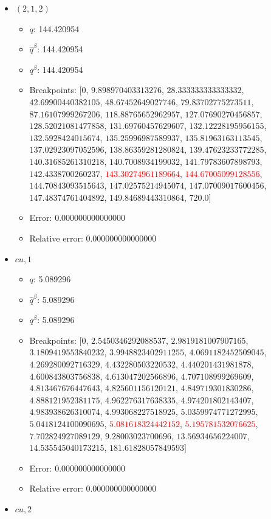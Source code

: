 \documentclass{article}%
\begin{document}
\begin{itemize}
\begin{itemize}
	\end{itemize}%
	\item $(2, 1, 2)$%
	\begin{itemize}%
		\item $q$: 144.420954%
		\item $\hat{q}^\beta$: 144.420954%
		\item $q^\beta$: 144.420954%
		\item Breakpoints: $[$$0$, $9.898970403313276$, $28.333333333333332$, $42.69900440382105$, $48.67452649027746$, $79.83702775273511$, $87.16107999267206$, $118.88765652962957$, $127.07690270456857$, $128.52021081477858$, $131.69760457629607$, $132.12228195956155$, $132.5928424015674$, $135.25996987589937$, $135.81963163113545$, $137.02923097052596$, $138.86359281280824$, $139.47623233772285$, $140.31685261310218$, $140.7008934199032$, $141.79783607898793$, $142.4338700260237$, \textcolor{red}{$143.30274961189664$}, \textcolor{red}{$144.67005099128556$}, $144.70843093515643$, $147.02575214945074$, $147.07009017600456$, $147.48374761404892$, $149.84689443310864$, $720.0$$]$%
		\item Error: 0.000000000000000%
		\item Relative error: 0.000000000000000%
	\end{itemize}%
	\item $\textit{cu},1$%
	\begin{itemize}%
		\item $q$: 5.089296%
		\item $\hat{q}^\beta$: 5.089296%
		\item $q^\beta$: 5.089296%
		\item Breakpoints: $[$$0$, $2.5450346292088537$, $2.9819181007907165$, $3.1809419553840232$, $3.9948823402911255$, $4.0691182452509045$, $4.269280092716329$, $4.432280503220532$, $4.440201431981878$, $4.600843803756838$, $4.613047202566896$, $4.707108999269609$, $4.813467676447643$, $4.825601156120121$, $4.849719301830286$, $4.888121952381175$, $4.962276317638335$, $4.974201802143407$, $4.983938626310074$, $4.993068227518925$, $5.0359974771272995$, $5.0418124100090695$, \textcolor{red}{$5.081618324442152$}, \textcolor{red}{$5.195781532076625$}, $7.702824927089129$, $9.28003023700696$, $13.56934656224007$, $14.535545040173215$, $181.61828057849593$$]$%
		\item Error: 0.000000000000000%
		\item Relative error: 0.000000000000000%
	\end{itemize}%
	\item $\textit{cu},2$%

\end{itemize}
\end{document}
